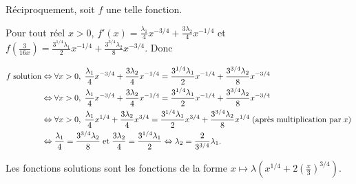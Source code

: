 {{Réciproquement, soit $f$ une telle fonction.

Pour tout réel $x>0$, $f'(x)= \frac{\lambda_1}{4}x^{-3/4}+ \frac{3\lambda_2}{4}x^{-1/4}$ et $f\left( \frac{3}{16x}\right)= \frac{3^{1/4}\lambda_1}{2}x^{-1/4}+ \frac{3^{3/4}\lambda_2}{8}x^{-3/4}$. Donc

\begin{align*}\ensuremath
f\;\text{solution}&\Leftrightarrow\forall x>0,\; \frac{\lambda_1}{4}x^{-3/4}+ \frac{3\lambda_2}{4}x^{-1/4}= \frac{3^{1/4}\lambda_1}{2}x^{-1/4}+ \frac{3^{3/4}\lambda_2}{8}x^{-3/4}\\
 &\Leftrightarrow\forall x>0,\; \frac{\lambda_1}{4}x^{-3/4}+ \frac{3\lambda_2}{4}x^{-1/4}= \frac{3^{1/4}\lambda_1}{2}x^{-1/4}+ \frac{3^{3/4}\lambda_2}{8}x^{-3/4}\\
 &\Leftrightarrow\forall x>0,\; \frac{\lambda_1}{4}x^{1/4}+ \frac{3\lambda_2}{4}x^{3/4}= \frac{3^{1/4}\lambda_1}{2}x^{3/4}+ \frac{3^{3/4}\lambda_2}{8}x^{1/4}\;(\text{après multiplication par}\;x)\\
 &\Leftrightarrow \frac{\lambda_1}{4}= \frac{3^{3/4}\lambda_2}{8}\;\text{et}\; \frac{3\lambda_2}{4}= \frac{3^{1/4}\lambda_1}{2}\Leftrightarrow\lambda_2= \frac{2}{3^{3/4}}\lambda_1.
\end{align*}

Les fonctions solutions sont les fonctions de la forme $x\mapsto\lambda\left(x^{1/4}+2\left( \frac{x}{3}\right)^{3/4}\right)$.
}
}
